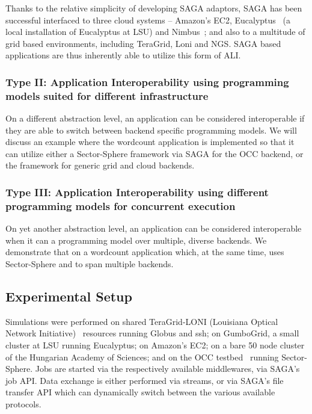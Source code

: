 \documentclass[3p,twocolumn]{elsarticle}
\begin{document}
Thanks to the relative simplicity of developing SAGA adaptors, SAGA
has been successful interfaced to three cloud systems -- Amazon's
EC2, Eucalyptus~\cite{eucalyptus} (a local installation of Eucalyptus
at LSU) and Nimbus~\cite{nimbus};  and also to a multitude of grid
based environments, including TeraGrid, Loni and NGS.  SAGA based
applications are thus inherently able to utilize this form of ALI.


\subsubsection{Type II: Application Interoperability using programming
  models suited for different infrastructure}
%
%
On a different abstraction level, an application can be considered
interoperable if they are able to switch between backend specific
programming models.  We will discuss an example where the wordcount
application is implemented so that it can utilize either a
Sector-Sphere framework via SAGA for the OCC backend, or the \smr
framework for generic grid and cloud backends.


\subsubsection{Type III: Application Interoperability using different
  programming models for concurrent execution}
%
%
On yet another abstraction level, an application can be considered
interoperable when it can  a programming model over
multiple, diverse backends.  We demonstrate that on a wordcount
application which, at the same time, uses Sector-Sphere and \smr
to span multiple backends.
            

\subsection{Experimental Setup}

Simulations were performed on shared TeraGrid-LONI (Louisiana Optical
Network Initiative)~\cite{loni-url} resources running Globus and ssh;
on GumboGrid, a small cluster at LSU running Eucalyptus; on Amazon's
EC2; on a bare 50 node cluster of the Hungarian Academy of Sciences;
and on the OCC testbed~\cite{occ_testbed} running Sector-Sphere.  Jobs
are started via the respectively available middlewares, via SAGA's job
API.  Data exchange is either performed via streams, or  via SAGA's
file transfer API which can dynamically switch between the various
available protocols.
\end{document}
